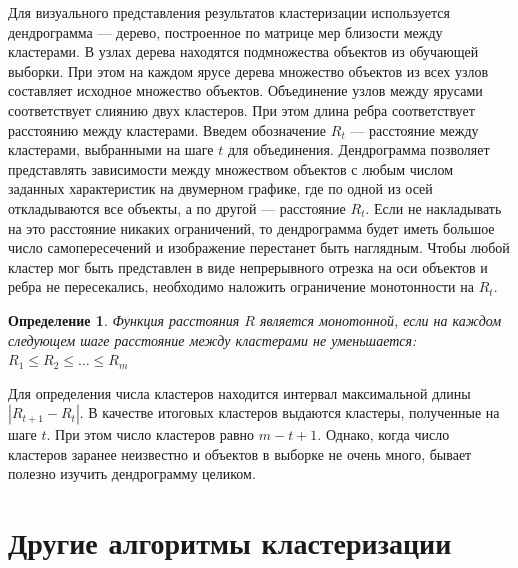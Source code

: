 \documentclass[article, 10pt]{disser}
\newtheorem{definition}{Определение}
\begin{document}
 Для визуального представления результатов кластеризации используется дендрограмма --- дерево, построенное по матрице мер близости между кластерами. В узлах дерева находятся подмножества объектов из обучающей выборки. При этом на каждом ярусе дерева множество объектов из всех узлов составляет исходное множество объектов. Объединение узлов между ярусами соответствует слиянию двух кластеров. При этом длина ребра соответствует расстоянию между кластерами. Введем обозначение $R_t$ --- расстояние между кластерами, выбранными на шаге $t$ для объединения. Дендрограмма позволяет представлять зависимости между множеством объектов с любым числом заданных характеристик на двумерном графике, где по одной из осей откладываются все объекты, а по другой --- расстояние $R_t$. Если не накладывать на это расстояние никаких ограничений, то дендрограмма будет иметь большое число самопересечений и изображение перестанет быть наглядным. Чтобы любой кластер мог быть представлен в виде непрерывного отрезка на оси объектов и ребра не пересекались, необходимо наложить ограничение монотонности на $R_t$.
 \begin{definition}
 Функция расстояния $R$ является монотонной, если на каждом следующем шаге расстояние между кластерами не уменьшается: $R_1 \leq R_2 \leq \dots \leq R_m$
 \end{definition}
Для определения числа кластеров находится интервал максимальной длины $|R_{t+1}−R_t|$. В качестве итоговых кластеров выдаются кластеры, полученные на шаге $t$. При этом число кластеров равно $m-t+1$. Однако, когда число кластеров заранее неизвестно и объектов в выборке не очень много, бывает полезно изучить дендрограмму целиком.

\section{Другие алгоритмы кластеризации}
\end{document}
